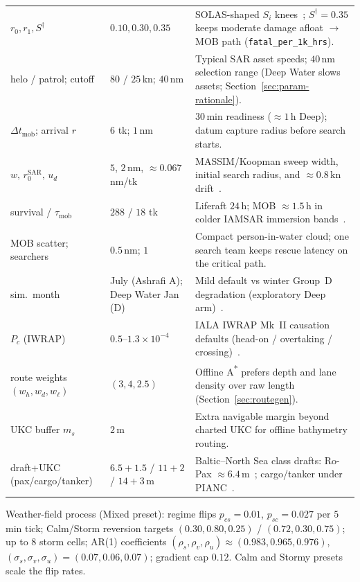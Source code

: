 \documentclass[cameraready]{Interspeech}
\begin{document}
\begin{table}[t]
\begin{tabular}{@{}llp{}@{}}
        $r_0,r_1,S^{\dagger}$ & $0.10,0.30,0.35$ &
        SOLAS-shaped $S_i$ knees~\cite{solas2020}; $S^{\dagger}{=}0.35$ keeps moderate damage afloat $\to$ MOB path (\texttt{fatal\_per\_1k\_hrs}). \\
        helo / patrol; cutoff & $80$ / $25$\,kn; $40$\,nm &
        Typical SAR asset speeds; $40$\,nm selection range (Deep Water slows assets; Section~\ref{sec:param-rationale}). \\
        $\Delta t_{\text{mob}}$; arrival $r$ & $6$ tk; $1$\,nm &
        $30$\,min readiness (${\approx}1$\,h Deep); datum capture radius before search starts. \\
        $w,\,r_0^{\text{SAR}},\,u_d$ & $5$, $2$\,nm, ${\approx}0.067$\,nm/tk &
        MASSIM/Koopman sweep width, initial search radius, and ${\approx}0.8$\,kn drift~\cite{karatas2018,koopman1980}. \\
        survival / $\tau_{\text{mob}}$ & $288$ / $18$ tk &
        Liferaft $24$\,h; MOB ${\approx}1.5$\,h in colder IAMSAR immersion bands~\cite{imosar2018,tipton2022survival}. \\
        MOB scatter; searchers & $0.5$\,nm; $1$ &
        Compact person-in-water cloud; one search team keeps rescue latency on the critical path. \\
        sim.\ month & July (Ashrafi A); Deep Water Jan (D) &
        Mild default vs winter Group~D degradation (exploratory Deep arm)~\cite{ashrafi2024}. \\
        $P_c$ (IWRAP) & $0.5$--$1.3{\times}10^{-4}$ &
        IALA IWRAP Mk~II causation defaults (head-on / overtaking / crossing)~\cite{friishansen2008iwrap}. \\
        route weights $(w_h,w_d,w_\ell)$ & $(3,4,2.5)$ &
        Offline A\textsuperscript{*} prefers depth and lane density over raw length (Section~\ref{sec:routegen}). \\
        UKC buffer $m_s$ & $2$\,m &
        Extra navigable margin beyond charted UKC for offline bathymetry routing. \\
        draft+UKC (pax/cargo/tanker) & $6.5{+}1.5$ / $11{+}2$ / $14{+}3$\,m &
        Baltic--North Sea class drafts: Ro-Pax ${\approx}6.4$\,m~\cite{gucma2018ropax}; cargo/tanker under PIANC~\cite{pianc2014}. \\
        \bottomrule
    \end{tabular}
\end{table}

Weather-field process (Mixed preset): regime flips $p_{cs}=0.01$, $p_{sc}=0.027$ per $5$\,min tick; Calm/Storm reversion targets $(0.30,0.80,0.25)$ / $(0.72,0.30,0.75)$; up to $8$ storm cells; AR(1) coefficients $(\rho_s,\rho_v,\rho_u)\approx(0.983,0.965,0.976)$, $(\sigma_s,\sigma_v,\sigma_u)=(0.07,0.06,0.07)$; gradient cap $0.12$. Calm and Stormy presets scale the flip rates.
\end{document}

